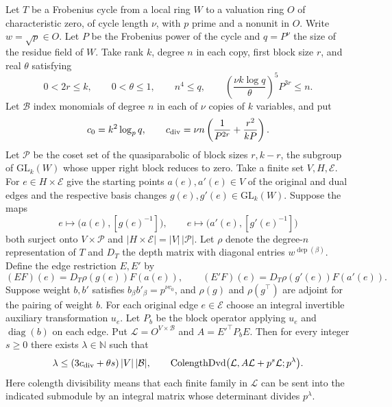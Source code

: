 \begin{lemma}
\label{lem:a-edge-pairing-colength}
\emitthmsource
Let $T$ be a Frobenius cycle from a local ring $W$ to a valuation ring $O$ of characteristic zero, of cycle length $\nu$, with $p$ prime and a nonunit in $O$. Write $w=\sqrt p\in O$. Let $P$ be the Frobenius power of the cycle and $q=P^\nu$ the size of the residue field of $W$. Take rank $k$, degree $n$ in each copy, first block size $r$, and real $\theta$ satisfying
\[
 0<2r\le k,\qquad 0<\theta\le1,\qquad n^4\le q,
 \qquad \left(\frac{\nu k\log q}{\theta}\right)^5 P^{3r}\le n .
\]
Let $\mathcal B$ index monomials of degree $n$ in each of $\nu$ copies of $k$ variables, and put
\[
  c_0=k^2\log_p q,\qquad
  c_{\rm div}=\nu n\left(\frac1{P^{2r}}+\frac{r^2}{kP}\right).
\]
Let $\mathcal P$ be the coset set of the quasiparabolic of block sizes $r,k-r$, the subgroup of $\mathrm{GL}_k(W)$ whose upper right block reduces to zero. Take a finite set $V,H,\mathcal E$. For $e\in H\times\mathcal E$ give the starting points $a(e),a'(e)\in V$ of the original and dual edges and the respective basis changes $g(e),g'(e)\in\mathrm{GL}_k(W)$. Suppose the maps
\[
 e\longmapsto\bigl(a(e),[g(e)^{-1}]\bigr),\qquad
 e\longmapsto\bigl(a'(e),[g'(e)^{-1}]\bigr)
\]
both surject onto $V\times\mathcal P$ and $|H\times\mathcal E|=|V|\,|\mathcal P|$. Let $\rho$ denote the degree-$n$ representation of $T$ and $D_T$ the depth matrix with diagonal entries $w^{\operatorname{dep}(\beta)}$. Define the edge restriction $E,E'$ by
\[
 (EF)(e)=D_T\rho(g(e))F(a(e)),\qquad
 (E'F)(e)=D_T\rho(g'(e))F(a'(e)).
\]
Suppose weight $b,b'$ satisfies $b_\beta b'_\beta=p^{\nu c_0}$, and $\rho(g)$ and $\rho(g^\top)$ are adjoint for the pairing of weight $b$. For each original edge $e\in\mathcal E$ choose an integral invertible auxiliary transformation $u_e$. Let $P_b$ be the block operator applying $u_e$ and $\operatorname{diag}(b)$ on each edge. Put $\mathcal L=O^{V\times\mathcal B}$ and $A=E'^\top P_bE$. Then for every integer $s\ge0$ there exists $\lambda\in\mathbb N$ such that
\[
 \lambda\le(3c_{\rm div}+\theta s)\,|V|\,|\mathcal B|,
 \qquad
 \operatorname{ColengthDvd}\bigl(\mathcal L,A\mathcal L+p^s\mathcal L;p^\lambda\bigr).
\]
Here colength divisibility means that each finite family in $\mathcal L$ can be sent into the indicated submodule by an integral matrix whose determinant divides $p^\lambda$.
\end{lemma}
